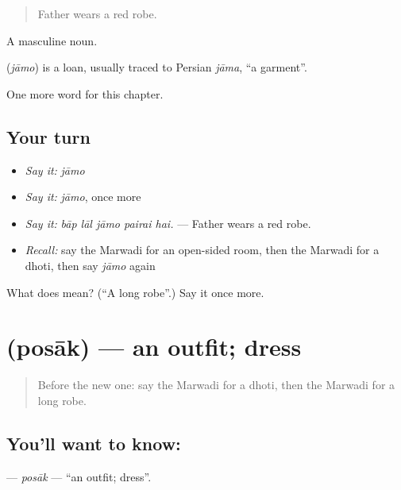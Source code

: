 \begin{quote}
Father wears a red robe.
\end{quote}

A masculine noun.

\begin{cousinweb}
\textbf{} (\emph{jāmo}) is a loan, usually traced to Persian \emph{jāma}, \textquotedblleft{}a garment\textquotedblright{}.
\end{cousinweb}

\begin{grammarlens}[title={What you've built}]
One more word for this chapter.
\end{grammarlens}

\subsection*{Your turn}
\begin{itemize}
\raggedright
  \item \emph{Say it:} \emph{jāmo}
  \item \emph{Say it:} \emph{jāmo}, once more
  \item \emph{Say it:} \emph{bāp lāl jāmo pairai hai.} — Father wears a red robe.
  \item \emph{Recall:} say the Marwadi for an open-sided room, then the Marwadi for a dhoti, then say \emph{jāmo} again
\end{itemize}

\begin{tcolorbox}[breakable,colback=teal!4,colframe=teal!35!black,title={Before you move on}]
What does  mean? (\textquotedblleft{}A long robe\textquotedblright{}.) Say it once more.
\end{tcolorbox}
\section[\texorpdfstring{\mw{पोसाक} (posāk)}{पोसाक (posāk)}]{ (posāk) — an outfit; dress}

\label{lesson:MW-C190-posak}



\begin{quote}
Before the new one: say the Marwadi for a dhoti, then the Marwadi for a long robe.
\end{quote}

\subsection*{You'll want to know: }
\textbf{} — \emph{posāk} — \textquotedblleft{}an outfit; dress\textquotedblright{}.

